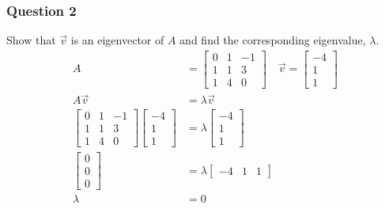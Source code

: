 \documentclass{math}
\begin{document}
\subsubsection*{Question 2}
Show that \( \vec{v} \) is an eigenvector of \( A \) and find the corresponding
eigenvalue, \( \lambda \).
\begin{align*}
  A &= \begin{bmatrix}
    0 & 1 & -1 \\
    1 & 1 & 3 \\
    1 & 4 & 0
  \end{bmatrix} \quad \vec{v} = \begin{bmatrix}
    -4 \\ 1 \\ 1
  \end{bmatrix} \\
  A\vec{v} &= \lambda\vec{v} \\
  \begin{bmatrix}
    0 & 1 & -1 \\
    1 & 1 & 3 \\
    1 & 4 & 0
  \end{bmatrix}\begin{bmatrix}
    -4 \\ 1 \\ 1
  \end{bmatrix} &= \lambda\begin{bmatrix}
    -4 \\ 1 \\ 1
  \end{bmatrix} \\
  \begin{bmatrix}
    0 \\ 0 \\ 0
  \end{bmatrix} &= \lambda\begin{bmatrix}
    -4 & 1 & 1
  \end{bmatrix} \\
  \lambda &= 0
\end{align*}
\end{document}
